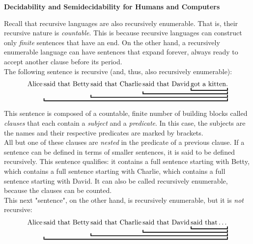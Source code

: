 \begin{tcolorbox}[breakable, enhanced, colback=textbook-blue, sharp corners]
	\vspace{2mm}
	\begin{center}
		\textbf{Decidability and Semidecidability for Humans and Computers}
	\end{center}
	\vspace{1mm}
	Recall that recursive languages are also recursively enumerable. That is, their recursive nature is \textit{countable}. This is because recursive languages can construct only \textit{finite} sentences that have an end. On the other hand, a recursively enumerable language can have sentences that expand forever, always ready to accept another clause before its period. \\
	
	The following sentence is recursive (and, thus, also recursively enumerable): 
	\begin{align*}
		\textnormal{Alice} 
		\underbracket{\textnormal{said that Betty}
		\underbracket{\textnormal{said that Charlie}
		\underbracket{\textnormal{said that David}
		\underbracket{\textnormal{got a kitten.}}}}}
	\end{align*}
	\vspace{1mm}
	
	This sentence is composed of a countable, finite number of building blocks called \textit{clauses} that each contain a \textit{subject} and a \textit{predicate}. In this case, the subjects are the names and their respective predicates are marked by brackets. \\
	
	All but one of these clauses are \textit{nested} in the predicate of a previous clause. If a sentence can be defined in terms of smaller sentences, it is said to be defined recursively. This sentence qualifies: it contains a full sentence starting with Betty, which contains a full sentence starting with Charlie, which contains a full sentence starting with David. It can also be called recursively enumerable, because the clauses can be counted. \\
	
	This next "sentence", on the other hand, is recursively enumerable, but it is \textit{not} recursive:
	\begin{align*}
	\textnormal{Alice} 
	\underbracket{\textnormal{said that Betty}
		\underbracket{\textnormal{said that Charlie}
			\underbracket{\textnormal{said that David}
				\underbracket{\textnormal{said that}\dots\vphantom{\textnormal{g}}}}}}
	\end{align*}
	\vspace{1mm}
	

\end{tcolorbox}
